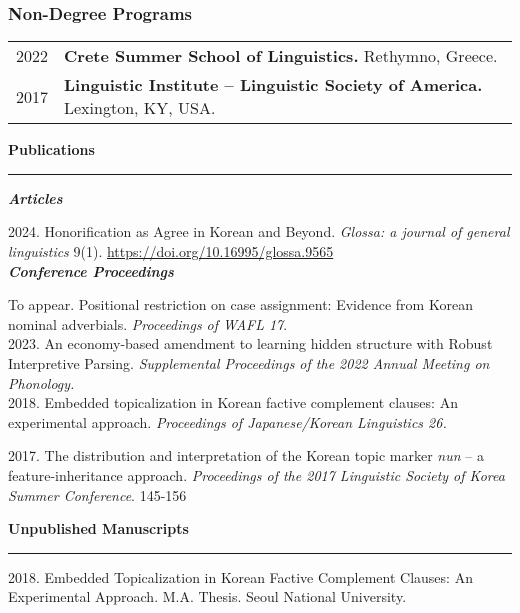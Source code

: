 \documentclass[11pt]{article}
\newcommand{\sect}[1]{{\fontsize{15}{25}\selectfont \textbf{#1}} {\vspace{0.1cm}} \hrule {\vspace{0.3cm}}}
\newcommand{\subsect}[1]{{\fontsize{12}{18}\selectfont \textit{\textbf{#1}}} {\vspace{0.3cm}}}
\begin{document}
\subsubsection*{Non-Degree Programs}
\begin{tabular}{p{}|p{}}
{2022}&{{\textbf{Crete Summer School of Linguistics.}} Rethymno, Greece.}\\
{2017}&{\textbf{Linguistic Institute -- Linguistic Society of America.} Lexington, KY, USA.}\\
\end{tabular}


{\vspace{1cm}}

{\sect{Publications}}

{\subsect{Articles}}

2024. Honorification as Agree in Korean and Beyond. {\textit{Glossa: a journal of general linguistics}} 9(1). {\href{https://doi.org/10.16995/glossa.9565}{https://doi.org/10.16995/glossa.9565}}\\

{\subsect{Conference Proceedings}}

{To appear.  Positional restriction on case assignment: Evidence from Korean nominal adverbials. {\textit{Proceedings of WAFL 17}.}}\\

{2023. An economy-based amendment to learning hidden structure with Robust Interpretive Parsing. \textit{Supplemental Proceedings of the 2022 Annual Meeting on Phonology.}}\\

{2018. Embedded topicalization in Korean factive complement clauses: An experimental approach. \textit{Proceedings of Japanese/Korean Linguistics 26.}}\\

{2017. The distribution and interpretation of the Korean topic marker \textit{nun} -- a feature-inheritance approach. \textit{Proceedings of the 2017 Linguistic Society of Korea Summer Conference}. 145-156\\

{\sect{Unpublished Manuscripts}}}

2018. Embedded Topicalization in Korean Factive Complement Clauses: An Experimental Approach. M.A. Thesis. Seoul National University.

\end{document}
